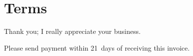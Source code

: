 \documentclass[a4paper,table]{article}
\begin{document}
\section*{Terms}
\label{sec:orgheadline5}

Thank you; I really appreciate your business.

Please send payment within 21~days of receiving this invoice.

\vfill
\end{document}
